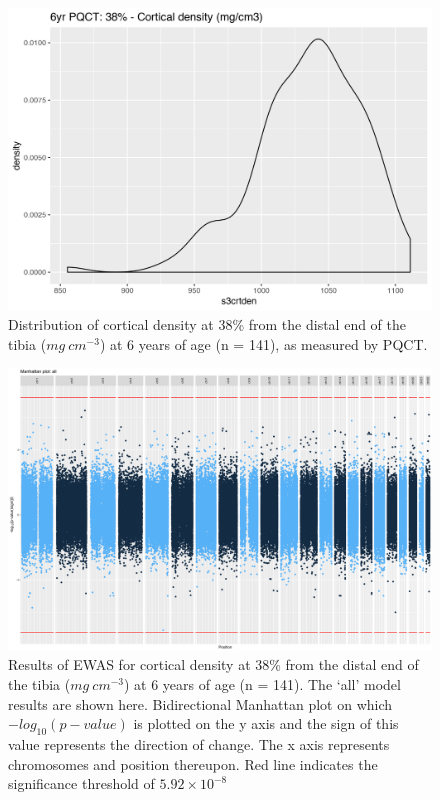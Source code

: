 \documentclass[
]{book}
\begin{document}
\begin{figure}

{\centering \includegraphics[width=0.8\linewidth]{figs/SWSs3crtden} 

}

\caption{Distribution of cortical density at 38\% from the distal end of the tibia (\(mg~cm^{-3}\)) at 6 years of age (n = 141), as measured by PQCT.}\label{fig:SWSs3crtden}
\end{figure}



\begin{figure}

{\centering \includegraphics[width=0.8\linewidth]{figs/SWSs3crtdenEPICewasManhattanAll} 

}

\caption{Results of EWAS for cortical density at 38\% from the distal end of the tibia (\(mg~cm^{-3}\)) at 6 years of age (n = 141). The `all' model results are shown here. Bidirectional Manhattan plot on which \(-log_{10}(p-value)\) is plotted on the y axis and the sign of this value represents the direction of change. The x axis represents chromosomes and position thereupon. Red line indicates the significance threshold of \(5.92\times10^{-8}\)}\label{fig:SWSs3crtdenEPICewasManhattanSVA}
\end{figure}
\end{document}
